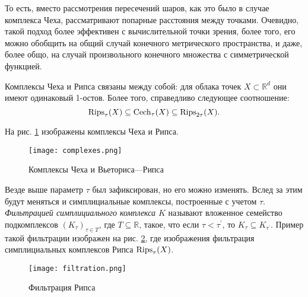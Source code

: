 То есть, вместо рассмотрения пересечений шаров, как это было в случае комплекса Чеха, рассматривают попарные расстояния между точками. Очевидно, такой подход более эффективен с вычислительной точки зрения, более того, его можно обобщить на общий случай конечного метрического пространства, и даже, более общо, на случай произвольного конечного множества с симметрической функцией.

Комплексы Чеха и Рипса связаны между собой: для облака точек $X \subset \mathbb{R}^d$ они имеют одинаковый 1-остов. Более того, справедливо следующее соотношение:
\[
	\mathrm{Rips}_\tau(X) \subseteq \mathrm{Cech}_\tau(X) \subseteq \mathrm{Rips}_{2\tau}(X).
\]

На рис. \ref{complexes} изображены комплексы Чеха и Рипса.

\begin{figure}[!htbp]
	\begin{center}
		\texttt{[image: complexes.png]}\\
		\caption{Комплексы Чеха и Вьеториса—Рипса}
		\label{complexes}
	\end{center}
\end{figure}

Везде выше параметр $\tau$ был зафиксирован, но его можно изменять. Вслед за этим будут меняться и симплициальные комплексы, построенные с учетом $\tau$. {\it Фильтрацией симплициального комплекса $K$} называют вложенное семейство подкомплексов $ (K_\tau)_{\tau \in T} $, где $ T \subseteq \mathbb{R} $, такое, что если $ \tau < \tau^{'} $, то $ K_\tau \subseteq K_{\tau^{'}} $. Пример такой фильтрации изображен на рис. \ref{ripsfilt}, где изображения фильтрация симплициальных комплексов Рипса $\mathrm{Rips}_\tau(X)$.

\begin{figure}[!htbp]
	\begin{center}
		\texttt{[image: filtration.png]}\\
		\caption{Фильтрация Рипса}
		\label{ripsfilt}
	\end{center}
\end{figure}

